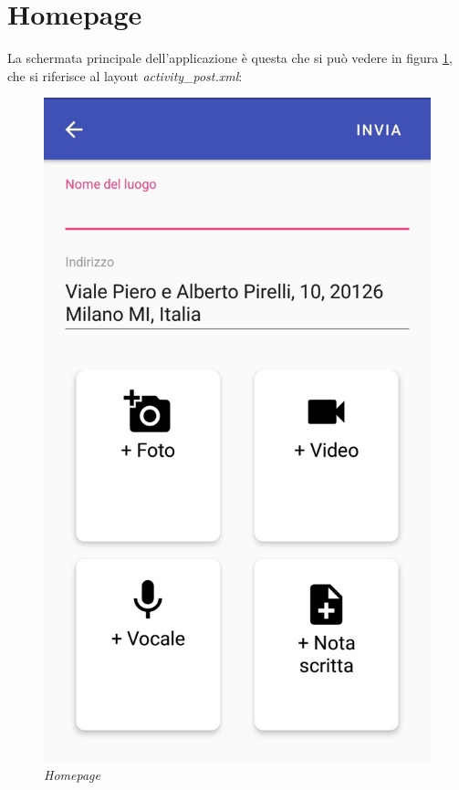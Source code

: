 \section{Homepage}
\label{homepage}
La schermata principale dell'applicazione è questa che si può vedere in figura \ref{fig:homepage}, che si riferisce al layout \textit{activity\_post.xml}:
\begin{figure}[!h]
    \centering
	\includegraphics[scale=0.15]{Tesi/images/Homepage.jpg}
	\caption{\textit{Homepage}}
	\label{fig:homepage}
\end{figure}

